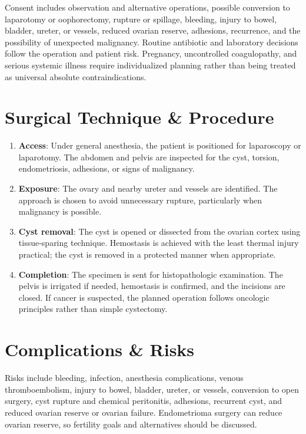 Consent includes observation and alternative operations, possible conversion to laparotomy or oophorectomy, rupture or spillage, bleeding, injury to bowel, bladder, ureter, or vessels, reduced ovarian reserve, adhesions, recurrence, and the possibility of unexpected malignancy. Routine antibiotic and laboratory decisions follow the operation and patient risk. Pregnancy, uncontrolled coagulopathy, and serious systemic illness require individualized planning rather than being treated as universal absolute contraindications.

\section*{Surgical Technique \& Procedure}
\begin{enumerate}
  \item \textbf{Access}: Under general anesthesia, the patient is positioned for laparoscopy or laparotomy. The abdomen and pelvis are inspected for the cyst, torsion, endometriosis, adhesions, or signs of malignancy.
  \item \textbf{Exposure}: The ovary and nearby ureter and vessels are identified. The approach is chosen to avoid unnecessary rupture, particularly when malignancy is possible.
  \item \textbf{Cyst removal}: The cyst is opened or dissected from the ovarian cortex using tissue-sparing technique. Hemostasis is achieved with the least thermal injury practical; the cyst is removed in a protected manner when appropriate.
  \item \textbf{Completion}: The specimen is sent for histopathologic examination. The pelvis is irrigated if needed, hemostasis is confirmed, and the incisions are closed. If cancer is suspected, the planned operation follows oncologic principles rather than simple cystectomy.
\end{enumerate}

\section*{Complications \& Risks}
Risks include bleeding, infection, anesthesia complications, venous thromboembolism, injury to bowel, bladder, ureter, or vessels, conversion to open surgery, cyst rupture and chemical peritonitis, adhesions, recurrent cyst, and reduced ovarian reserve or ovarian failure. Endometrioma surgery can reduce ovarian reserve, so fertility goals and alternatives should be discussed.

